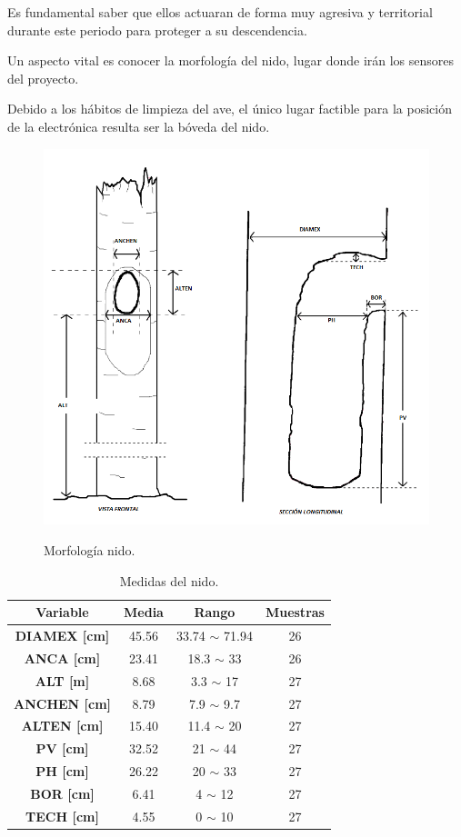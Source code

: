Es fundamental saber que ellos actuaran de forma muy agresiva y territorial durante este periodo para proteger a su descendencia.

Un aspecto vital es conocer la morfología del nido, lugar donde irán los sensores del proyecto.

Debido a los hábitos de limpieza del ave, el único lugar factible para la posición de la electrónica resulta ser la bóveda del nido. 
\begin{figure}[H]
	\centering
	\includegraphics[width=0.5\linewidth]{ImagenesIntroduccion/morfologia_nido}
	\label{fig:morfología_nido}
	\caption{Morfología nido.}
\end{figure}

\begin{table}[H]
\centering
\begin{tabular}{|c|c|c|c|}
\hline
\textbf{Variable}    & \textbf{Media} & \textbf{Rango}     & \textbf{Muestras} \\ \hline
\textbf{DIAMEX [cm]} & 45.56          & 33.74 $\sim$ 71.94 & 26                \\ \hline
\textbf{ANCA [cm]}   & 23.41          & 18.3 $\sim$ 33     & 26                \\ \hline
\textbf{ALT [m]}     & 8.68           & 3.3 $\sim$ 17      & 27                \\ \hline
\textbf{ANCHEN [cm]} & 8.79           & 7.9 $\sim$ 9.7     & 27                \\ \hline
\textbf{ALTEN [cm]}  & 15.40          & 11.4 $\sim$ 20     & 27                \\ \hline
\textbf{PV [cm]}     & 32.52          & 21 $\sim$ 44       & 27                \\ \hline
\textbf{PH [cm]}     & 26.22          & 20 $\sim$ 33       & 27                \\ \hline
\textbf{BOR [cm]}    & 6.41           & 4 $\sim$ 12        & 27                \\ \hline
\textbf{TECH [cm]}   & 4.55           & 0 $\sim$ 10        & 27                \\ \hline
\end{tabular}
\caption{Medidas del nido.}
\end{table}



